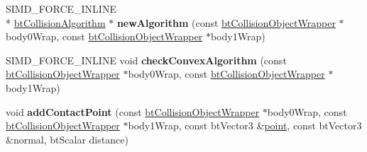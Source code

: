 \begin{DoxyCompactItemize}
\item 
\hypertarget{classbt_g_impact_collision_algorithm_a9992300a3b680b51c546bdca268c26c4}{S\+I\+M\+D\+\_\+\+F\+O\+R\+C\+E\+\_\+\+I\+N\+L\+I\+N\+E \\*
\hyperlink{classbt_collision_algorithm}{bt\+Collision\+Algorithm} $\ast$ {\bfseries new\+Algorithm} (const \hyperlink{structbt_collision_object_wrapper}{bt\+Collision\+Object\+Wrapper} $\ast$body0\+Wrap, const \hyperlink{structbt_collision_object_wrapper}{bt\+Collision\+Object\+Wrapper} $\ast$body1\+Wrap)}\label{classbt_g_impact_collision_algorithm_a9992300a3b680b51c546bdca268c26c4}

\item 
\hypertarget{classbt_g_impact_collision_algorithm_af2e742d511464326eddcdf8266a34ab9}{S\+I\+M\+D\+\_\+\+F\+O\+R\+C\+E\+\_\+\+I\+N\+L\+I\+N\+E void {\bfseries check\+Convex\+Algorithm} (const \hyperlink{structbt_collision_object_wrapper}{bt\+Collision\+Object\+Wrapper} $\ast$body0\+Wrap, const \hyperlink{structbt_collision_object_wrapper}{bt\+Collision\+Object\+Wrapper} $\ast$body1\+Wrap)}\label{classbt_g_impact_collision_algorithm_af2e742d511464326eddcdf8266a34ab9}

\item 
\hypertarget{classbt_g_impact_collision_algorithm_ae8b6641aa8bacc59d362040e18a18fcc}{void {\bfseries add\+Contact\+Point} (const \hyperlink{structbt_collision_object_wrapper}{bt\+Collision\+Object\+Wrapper} $\ast$body0\+Wrap, const \hyperlink{structbt_collision_object_wrapper}{bt\+Collision\+Object\+Wrapper} $\ast$body1\+Wrap, const bt\+Vector3 \&\hyperlink{structpoint}{point}, const bt\+Vector3 \&normal, bt\+Scalar distance)}\label{classbt_g_impact_collision_algorithm_ae8b6641aa8bacc59d362040e18a18fcc}

\end{DoxyCompactItemize}
